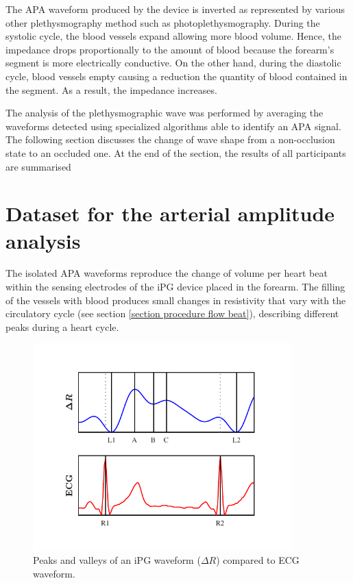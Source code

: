 The APA waveform produced by the device is inverted as represented by various other plethysmography method such as photoplethysmography. During the systolic cycle, the blood vessels expand allowing more blood volume. Hence, the impedance drops proportionally to the amount of blood because the forearm's segment is more electrically conductive. On the other hand, during the diastolic cycle, blood vessels empty causing a reduction the quantity of blood contained in the segment. As a result, the impedance increases.

The analysis of the plethysmographic wave was performed by averaging the waveforms detected using specialized algorithms able to identify an APA signal. The following section discusses the change of wave shape from a non-occlusion state to an occluded one. At the end of the section, the results of all participants are summarised 

\section{Dataset for the arterial amplitude analysis}
\label{section apa 1}
The isolated APA waveforms reproduce the change of volume per heart beat within the sensing electrodes of the iPG device placed in the forearm. The filling of the vessels with blood produces small changes in resistivity that vary with the circulatory cycle (see section \ref{section procedure flow beat}), describing different peaks during a heart cycle.

\begin{figure}[!htpb]
	\centering
	\includegraphics[width=10cm,keepaspectratio]{figure_apa_1}
	\caption[Marker ppoints in an iPG waveform]{Peaks and valleys of an iPG waveform ($\Delta R$) compared to ECG waveform.}
	\label{fig:markers iPG}
\end{figure}

